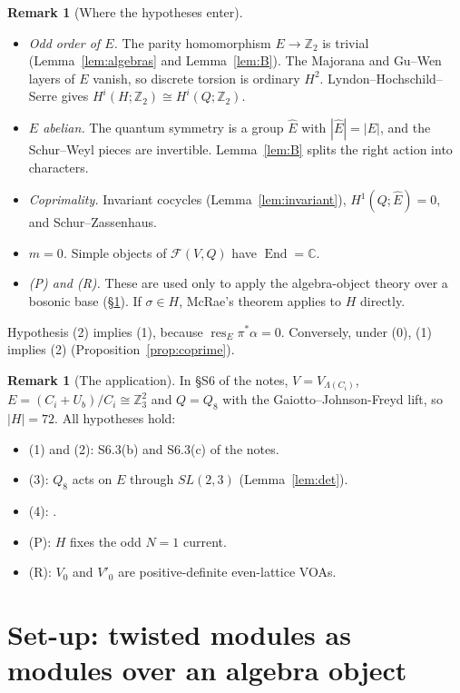 \documentclass[11pt]{article}
\theoremstyle{definition}
\newtheorem{remark}[theorem]{Remark}
\newcommand{\cF}{\mathcal F}
\newcommand{\End}{\operatorname{End}}
\newcommand{\Z}{\mathbb Z}
\newcommand{\C}{\mathbb C}
\newcommand{\Ehat}{\widehat E}
\begin{document}
\begin{remark}[Where the hypotheses enter]\label{rem:hyp}
\begin{itemize}[nosep]
\item \emph{Odd order of $E$.} The parity homomorphism $E\to\Z_2$ is trivial (Lemma~\ref{lem:algebras}
and Lemma~\ref{lem:B}). The Majorana and Gu--Wen layers of $E$ vanish, so discrete torsion is
ordinary $H^2$. Lyndon--Hochschild--Serre gives $H^i(H;\Z_2)\cong H^i(Q;\Z_2)$.
\item \emph{$E$ abelian.} The quantum symmetry is a group $\Ehat$ with $|\Ehat|=|E|$, and the
Schur--Weyl pieces are invertible. Lemma~\ref{lem:B} splits the right action into characters.
\item \emph{Coprimality.} Invariant cocycles (Lemma~\ref{lem:invariant}), $H^1(Q;\Ehat)=0$, and
Schur--Zassenhaus.
\item \emph{$m=0$.} Simple objects of $\cF(V,Q)$ have $\End=\C$.
\item \emph{(P) and (R).} These are used only to apply the algebra-object theory over a bosonic
base (\S\ref{sec:setup}). If $\sigma\in H$, McRae's theorem applies to $H$ directly.
\end{itemize}
Hypothesis (2) implies (1), because $\operatorname{res}_E\pi^*\alpha=0$. Conversely, under (0),
(1) implies (2) (Proposition~\ref{prop:coprime}).
\end{remark}

\begin{remark}[The application]
In \S S6 of the notes, $V=V_{\Lambda(C_i)}$, $E=(C_i+U_b)/C_i\cong\Z_3^2$ and $Q=Q_8$ with
the Gaiotto--Johnson-Freyd lift, so $|H|=72$. All hypotheses hold:
\begin{itemize}[nosep]
\item (1) and (2): S6.3(b) and S6.3(c) of the notes.
\item (3): $Q_8$ acts on $E$ through $SL(2,3)$ (Lemma~\ref{lem:det}).
\item (4): \cite[Ex.~4.4]{GJF}.
\item (P): $H$ fixes the odd $N=1$ current.
\item (R): $V_0$ and $V'_0$ are positive-definite even-lattice VOAs.
\end{itemize}
\end{remark}

\section{Set-up: twisted modules as modules over an algebra object}\label{sec:setup}
\end{document}
